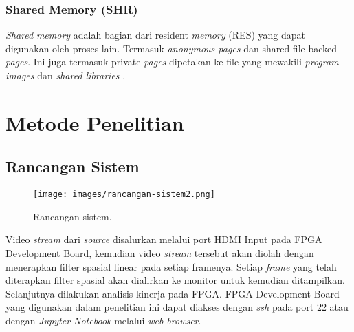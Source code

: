 \subsubsection{Shared Memory (SHR)}

\textit{Shared} \textit{memory} adalah bagian dari resident \textit{memory} (RES) yang dapat digunakan oleh proses lain. Termasuk \textit{anonymous pages} dan shared file-backed \textit{pages}. Ini juga termasuk private \textit{pages} dipetakan ke file yang mewakili \textit{program images} dan \textit{shared libraries} \cite{manual:linux}. 




\section{Metode Penelitian}

\subsection{Rancangan Sistem}
\begin{figure}[ht]
    \texttt{[image: images/rancangan-sistem2.png]}
    \caption{Rancangan sistem.}
    \label{fig:rancangan-sistem}
\end{figure}

Video \textit{stream} dari \textit{source} disalurkan melalui port HDMI Input pada FPGA Development Board, kemudian video \textit{stream} tersebut akan diolah dengan menerapkan filter spasial linear pada setiap framenya. Setiap \textit{frame} yang telah diterapkan filter spasial akan dialirkan ke monitor untuk kemudian ditampilkan. Selanjutnya dilakukan analisis kinerja pada FPGA. FPGA Development Board yang digunakan dalam penelitian ini dapat diakses dengan \textit{ssh} pada port 22 atau dengan \textit{Jupyter Notebook} melalui \textit{web browser}.

